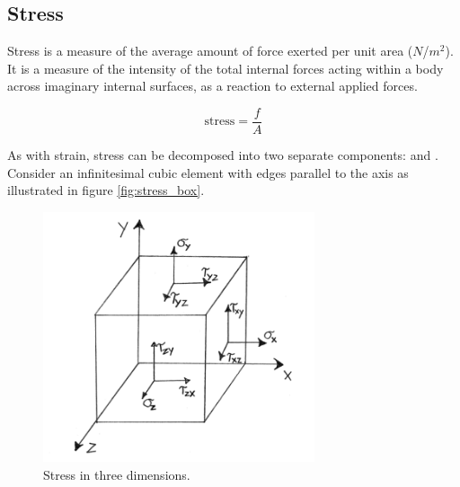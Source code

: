 \subsection{Stress}
\label{sec:physics_stress}
Stress is a measure of the average amount of force exerted per unit
area ($N$/$m^2$). It is a measure of the intensity of the total
internal forces acting within a body across imaginary internal
surfaces, as a reaction to external applied forces.

\begin{equation}
\mbox{stress} = \frac{f}{A}
\end{equation}


As with strain, stress can be decomposed into two separate components:
 and .
Consider an infinitesimal cubic element with
edges parallel to the axis as illustrated in figure
\vref{fig:stress_box}.


\begin{figure}
  \centering
  \includegraphics[width=8cm]{./images/physics_stress_box.png}
\caption{Stress in three dimensions.}
\label{fig:stress_box}
\end{figure}

